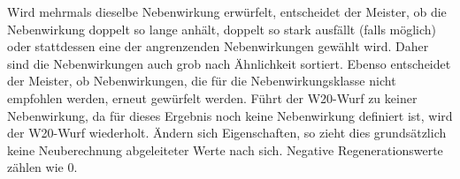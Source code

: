 Wird mehrmals dieselbe Nebenwirkung erwürfelt, entscheidet der Meister, ob die Nebenwirkung doppelt so lange anhält, doppelt so stark ausfällt (falls möglich) oder stattdessen eine der angrenzenden Nebenwirkungen gewählt wird. Daher sind die Nebenwirkungen auch grob nach Ähnlichkeit sortiert. Ebenso entscheidet der Meister, ob Nebenwirkungen, die für die Nebenwirkungsklasse nicht empfohlen werden, erneut gewürfelt werden. Führt der W20-Wurf zu keiner Nebenwirkung, da für dieses Ergebnis noch keine Nebenwirkung definiert ist, wird der W20-Wurf wiederholt. Ändern sich Eigenschaften, so zieht dies grundsätzlich keine Neuberechnung abgeleiteter Werte nach sich. Negative Regenerationswerte zählen wie 0.

